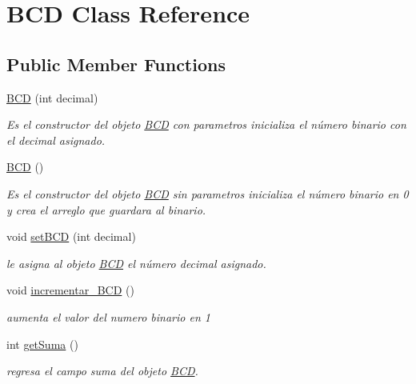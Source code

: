 \hypertarget{classBCD}{}\section{B\+CD Class Reference}
\label{classBCD}
\subsection*{Public Member Functions}
\begin{DoxyCompactItemize}
\item 
\hyperlink{classBCD_a83b94116c047169535e9e61aab6d6bb3}{B\+CD} (int decimal)
\begin{DoxyCompactList}\small\item\em Es el constructor del objeto \hyperlink{classBCD}{B\+CD} con parametros inicializa el número binario con el decimal asignado. \end{DoxyCompactList}\item 
\mbox{\label{classBCD_a3d44b73ea05ac6ff8fe78ca08a1e78e6}} 
\hyperlink{classBCD_a3d44b73ea05ac6ff8fe78ca08a1e78e6}{B\+CD} ()
\begin{DoxyCompactList}\small\item\em Es el constructor del objeto \hyperlink{classBCD}{B\+CD} sin parametros inicializa el número binario en 0 y crea el arreglo que guardara al binario. \end{DoxyCompactList}\item 
void \hyperlink{classBCD_ae6596927da1233e50f527192f7171269}{set\+B\+CD} (int decimal)
\begin{DoxyCompactList}\small\item\em le asigna al objeto \hyperlink{classBCD}{B\+CD} el número decimal asignado. \end{DoxyCompactList}\item 
\mbox{\label{classBCD_a7dc5f8bee9eca70567d6d5f09cc2c55f}} 
void \hyperlink{classBCD_a7dc5f8bee9eca70567d6d5f09cc2c55f}{incrementar\+\_\+\+B\+CD} ()
\begin{DoxyCompactList}\small\item\em aumenta el valor del numero binario en 1 \end{DoxyCompactList}\item 
int \hyperlink{classBCD_a49603f54ebd9578939224cd5a5a8d96d}{get\+Suma} ()
\begin{DoxyCompactList}\small\item\em regresa el campo suma del objeto \hyperlink{classBCD}{B\+CD}. \end{DoxyCompactList}\end{DoxyCompactItemize}
